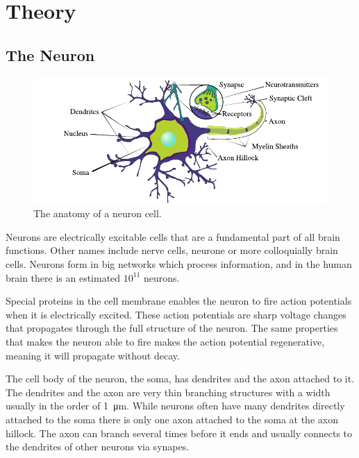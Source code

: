 \documentclass[altfont, fleqn]{uiophd}
\begin{document}
\chapter{Theory}

\vspace{1em} 
\startcontents
{}
  
\section{The Neuron}
\begin{figure}[h]
    \centering
    \includegraphics[width=1.0\textwidth]{images/sec_2/neuron_structure.pdf}
    \caption{The anatomy of a neuron cell. }
    \label{fig:2_neuron}
\end{figure}
\noindent
Neurons 
are electrically excitable cells
that are a fundamental part of all brain functions.
Other names include {nerve cells}, {neurone} or more 
colloquially {brain cells}.
Neurons form in big networks 
which process information,
and in the human brain there is an estimated $10^{11}$ neurons.

Special proteins in the cell membrane enables the neuron to
fire action potentials when it is electrically excited. 
These action potentials are sharp voltage changes that propagates through
the full structure of the neuron.
The same properties that makes the neuron able to fire makes 
the action potential {regenerative}, meaning it will propagate
without decay.

The cell body of the neuron, the {soma}, has {dendrites} and 
the axon attached to it. 
The dendrites and the axon are very thin branching structures 
with a width usually in the order of \SI{1}{\micro\metre}. 
While neurons often have many dendrites directly attached to the soma
there is only one axon attached to the soma at the axon hillock.
The axon can branch several times before it ends and 
usually connects to the dendrites of other neurons via synapes.
\end{document}
